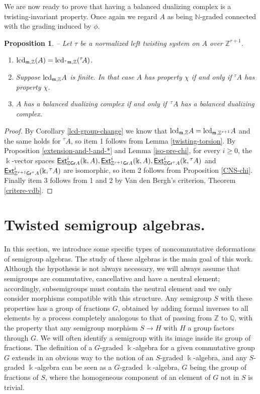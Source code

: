 \documentclass[twoside,11pt]{article}
\newcommand{\lcd}{{\rm lcd}}
\renewcommand{\k}{\Bbbk}
\newcommand{\N}{{\mathbb N}}
\newcommand{\Z}{{\mathbb Z}}
\newcommand{\QQ}{{\mathbb Q}}
\newcommand{\m}{{\mathfrak m}}
\newcommand{\GrMod}{{\sf Gr}}
\newcommand{\EXT}{\underline{\sf Ext}}
\newtheorem{subproposition}[subtheorem]{Proposition}
\begin{document}
We are now ready to prove that having a balanced dualizing complex is a twisting-invariant
property. Once again we regard $A$ as being $\N$-graded connected with the grading induced
by $\phi$.
\begin{subproposition} -- \label{tranfert-bdc}
Let $\tau$ be a normalized left twisting system on $A$ over $\Z^{r+1}$. 
\begin{enumerate}
\item $\lcd_{\m,\Z}(A) = \lcd_{{}^\tau \m, \Z}({}^\tau\!A)$.

\item Suppose $\lcd_{\m, \Z} A$ is finite. In that case $A$ has property $\chi$ if and only if
${}^\tau\! A$ has property $\chi$.

\item $A$ has a balanced dualizing complex if and only if $\,{}^\tau\! A$ has a balanced
dualizing complex.
\end{enumerate}
\end{subproposition}
\begin{proof}
By Corollary \ref{lcd-group-change} we know that $\lcd_{\m, \Z} A = \lcd_{\m,
\Z^{r+1}} A$ and the same holds for ${}^\tau A$, so item 1 follows from Lemma
\ref{twisting-torsion}. By Proposition \ref{extension-and-!-and-*} and Lemma
\ref{iso-pre-chi}, for every $i \geq 0$, the $\k$-vector spaces $\EXT_{\Z\GrMod A}^i(\k, A),
\EXT_{\Z^{r+1}\GrMod A}^i(\k, A), \EXT_{\Z\GrMod {}^\tau A}^i(\k, {}^\tau A)$ and
$\EXT_{\Z^{r+1}\GrMod {}^\tau A}^i(\k, {}^\tau A)$ are isomorphic, so item 2 follows
from Proposition \ref{CNS-chi}. Finally item 3 follows from 1 and 2 by Van den Bergh's
criterion, Theorem \ref{critere-vdb}.
\end{proof}

\section{Twisted semigroup algebras.}\label{tsa}
In this section, we introduce some specific types of noncommutative deformations of
semigroup algebras. The study of these algebras is the main goal of this work. Although
the hypothesis is not always necessary, we will always assume that semigroups are
commutative, cancellative and have a neutral element; accordingly, subsemigroups must
contain the neutral element and we only consider morphisms compatible with this structure.
Any semigroup $S$ with these properties has a group of fractions $G$, obtained by adding
formal inverses to all elements by a process completely analogous to that of passing from
$\Z$ to $\QQ$, with the property that any semigroup morphism $S \to H$ with $H$ a group
factors through $G$. We will often identify a semigroup with its image inside its group of
fractions. The definition of a $G$-graded $\k$-algebra for a given commutative group $G$
extends in an obvious way to the notion of an $S$-graded $\k$-algebra, and any $S$-graded
$\k$-algebra can be seen as a $G$-graded $\k$-algebra, $G$ being the group of fractions of
$S$, where the homogeneous component of an element of $G$ not in $S$ is trivial.
	
\end{document}
